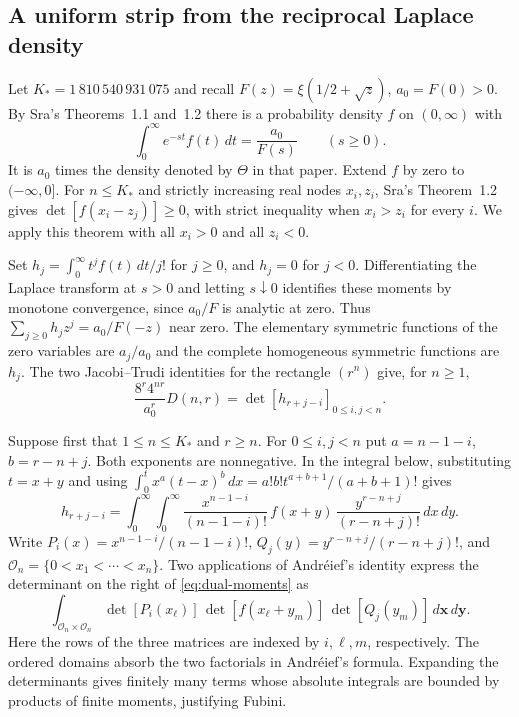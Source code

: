 \documentclass[11pt,a4paper,reqno]{amsart}
\numberwithin{equation}{section}
\begin{document}
\subsection{A uniform strip from the reciprocal Laplace density}\label{sec:sra}
Let \(K_*=1\,810\,540\,931\,075\) and recall \(F(z)=\xi(1/2+\sqrt z)\), \(a_0=F(0)>0\).
By Sra's Theorems~1.1 and~1.2 \cite{sra} there is a probability density \(f\) on \((0,\infty)\) with
\[
 \int_0^\infty e^{-st}f(t)\,dt=\frac{a_0}{F(s)}\qquad(s\ge0).
\]
It is \(a_0\) times the density denoted by \(\Theta\) in that paper. Extend \(f\) by zero to \((-\infty,0]\). For \(n\le K_*\) and strictly increasing real nodes \(x_i,z_i\), Sra's Theorem~1.2 gives \(\det[f(x_i-z_j)]\ge0\), with strict inequality when \(x_i>z_i\) for every \(i\). We apply this theorem with all \(x_i>0\) and all \(z_i<0\).

Set \(h_j=\int_0^\infty t^j f(t)\,dt/j!\) for \(j\ge0\), and \(h_j=0\) for \(j<0\). Differentiating the Laplace transform at \(s>0\) and letting \(s\downarrow0\) identifies these moments by monotone convergence, since \(a_0/F\) is analytic at zero. Thus \(\sum_{j\ge0}h_jz^j=a_0/F(-z)\) near zero. The elementary symmetric functions of the zero variables are \(a_j/a_0\) and the complete homogeneous symmetric functions are \(h_j\). The two Jacobi--Trudi identities for the rectangle \((r^n)\) give, for \(n\ge1\),
\begin{equation}\label{eq:dual-moments}
 \frac{8^r4^{nr}}{a_0^r}D(n,r)=\det[h_{r+j-i}]_{0\le i,j<n}.
\end{equation}

Suppose first that \(1\le n\le K_*\) and \(r\ge n\). For \(0\le i,j<n\) put \(a=n-1-i\), \(b=r-n+j\). Both exponents are nonnegative. In the integral below, substituting \(t=x+y\) and using \(\int_0^t x^a(t-x)^b\,dx=a!b!t^{a+b+1}/(a+b+1)!\) gives
\[
 h_{r+j-i}=\int_0^\infty\!\int_0^\infty
 \frac{x^{n-1-i}}{(n-1-i)!}\,f(x+y)\,
 \frac{y^{r-n+j}}{(r-n+j)!}\,dx\,dy .
\]
Write \(P_i(x)=x^{n-1-i}/(n-1-i)!\), \(Q_j(y)=y^{r-n+j}/(r-n+j)!\), and \(\mathcal O_n=\{0<x_1<\cdots<x_n\}\). Two applications of Andréief's identity express the determinant on the right of \eqref{eq:dual-moments} as
\[
 \int_{\mathcal O_n\times\mathcal O_n}
 \det[P_i(x_\ell)]\,\det[f(x_\ell+y_m)]\,
 \det[Q_j(y_m)]\,d\mathbf x\,d\mathbf y .
\]
Here the rows of the three matrices are indexed by \(i,\ell,m\), respectively. The ordered domains absorb the two factorials in Andréief's formula. Expanding the determinants gives finitely many terms whose absolute integrals are bounded by products of finite moments, justifying Fubini.
\end{document}
